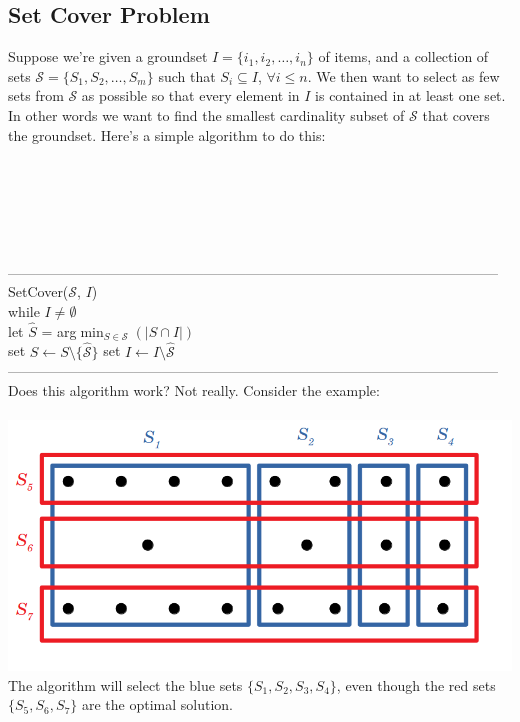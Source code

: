 \documentclass{article}
\newcommand{\emp}{\emptyset}
\newcommand{\ds}{\displaystyle}
\newcommand{\mcal}[1]{\mathcal{#1}}
\newcommand{\sm}{\setminus}
\begin{document}
\subsection{Set Cover Problem}
Suppose we're given a groundset $I = \{i_1, i_2, \dots, i_n\}$ of items, and a collection of sets $\mcal{S} = \{S_1, S_2, \dots, S_m\}$  such that $S_i \subseteq I$, $\forall i \leq n$. We then want to select as few sets from $\mcal{S}$ as possible so that every element in $I$ is contained in at least one set. In other words we want to find the smallest cardinality subset of $\mcal{S}$ that covers the groundset. Here's a simple algorithm to do this:\\\\\\\\\\\\\\
---------------------------------------------------------------------------------------------------------
SetCover($\mcal{S}$, $I$)\\
	\hspace*{7mm} while $I \neq \emp$\\
	\hspace*{14mm} let $\hat{S}$ = arg$\ds\min_{S \in \mcal{S}}(|S \cap I|)$\\
	\hspace*{14mm} set $S \leftarrow S\sm \{\hat{\mcal{S}}\}$
	\hspace*{14mm} set $I \leftarrow I \sm \hat{\mcal{S}}$\\
---------------------------------------------------------------------------------------------------------\\
Does this algorithm work? Not really. Consider the example:\\\\
\includegraphics[scale=0.4]{scce}\\
The algorithm will select the blue sets $\{S_1, S_2, S_3, S_4\}$, even though the red sets $\{S_5, S_6, S_7\}$ are the optimal solution.
\end{document}
